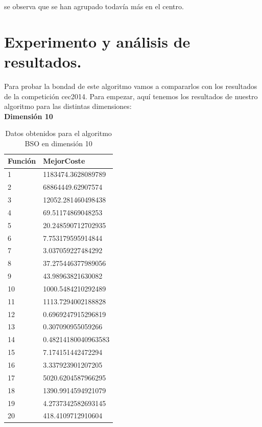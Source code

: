 se observa que se han agrupado todavía más en el centro.


\section{Experimento y análisis de resultados.}

Para probar la bondad de este algoritmo vamos a compararlos con los resultados de la competición cec2014. Para empezar, aquí tenemos los resultados de nuestro algoritmo para las distintas dimensiones:\\

\textbf{Dimensión 10}

\begin{table}[htbp]
	\begin{center}
		\begin{tabular}{|l|l|}
			\hline
			Función & MejorCoste \\
			\hline \hline
			1 & 1183474.3628089789\\ \hline
			2 & 68864449.62907574 \\ \hline
			3 & 12052.281460498438 \\ \hline
			4 & 69.51174869048253 \\ \hline
			5 & 20.248590712702935 \\ \hline
			6 & 7.753179595914844 \\ \hline
			7 & 3.037059227484292 \\ \hline
			8 & 37.275446377989056 \\ \hline
			9 & 43.98963821630082 \\ \hline
			10 & 1000.5484210292489 \\ \hline
			11 & 1113.7294002188828 \\ \hline
			12 & 0.6969247915296819 \\ \hline
			13 & 0.307090955059266 \\ \hline
			14 & 0.48214180040963583 \\ \hline
			15 & 7.174151442472294 \\ \hline
			16 & 3.337923901207205 \\ \hline
			17 & 5020.6204587966295 \\ \hline
			18 & 1390.9914594921079 \\ \hline
			19 & 4.2737342582693145 \\ \hline
			20 & 418.4109712910604 \\ \hline

		\end{tabular}
		\caption{Datos obtenidos para el algoritmo BSO en dimensión 10}
		\label{tabla:Dimension10}
	\end{center}
\end{table}

